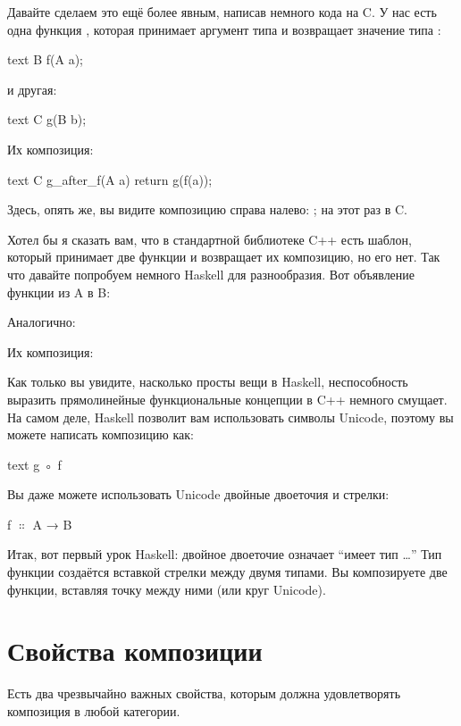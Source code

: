 Давайте сделаем это ещё более явным, написав немного кода на C. У нас есть одна
функция , которая принимает аргумент типа  и
возвращает значение типа :

\begin{snip}{text}
B f(A a);
\end{snip}
и другая:

\begin{snip}{text}
C g(B b);
\end{snip}
Их композиция:

\begin{snip}{text}
C g_after_f(A a)
{
    return g(f(a));
}
\end{snip}
Здесь, опять же, вы видите композицию справа налево: ; на этот
раз в C.

Хотел бы я сказать вам, что в стандартной библиотеке C++ есть шаблон,
который принимает две функции и возвращает их композицию, но
его нет. Так что давайте попробуем немного Haskell для разнообразия. Вот
объявление функции из A в B:

Аналогично:

Их композиция:

Как только вы увидите, насколько просты вещи в Haskell, неспособность выразить
прямолинейные функциональные концепции в C++ немного смущает. На самом
деле, Haskell позволит вам использовать символы Unicode, поэтому вы можете написать
композицию как:
\begin{snip}{text}
g ◦ f
\end{snip}

Вы даже можете использовать Unicode двойные двоеточия и стрелки:
\begin{snipv}
f \ensuremath{\Colon} A → B
\end{snipv}
Итак, вот первый урок Haskell: двойное двоеточие означает ``имеет тип
\ldots{}'' Тип функции создаётся вставкой стрелки между
двумя типами. Вы композируете две функции, вставляя точку между ними
(или круг Unicode).

\section{Свойства композиции}

Есть два чрезвычайно важных свойства, которым должна удовлетворять композиция в любой
категории.

